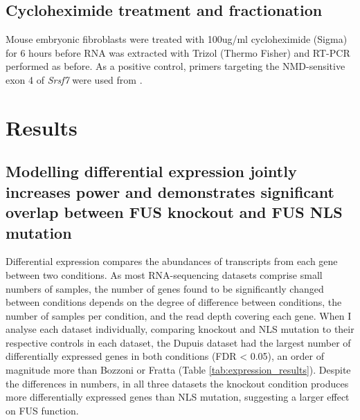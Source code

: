 \subsection{Cycloheximide treatment and fractionation}
Mouse embryonic fibroblasts were treated with 100ug/ml cycloheximide (Sigma) for 6 hours before RNA was extracted with Trizol (Thermo Fisher) and RT-PCR performed as before. 
As a positive control, primers targeting the NMD-sensitive exon 4 of \textit{Srsf7} were used from \citep{Edwards2016}.

\clearpage


\section{Results}

\subsection{Modelling differential expression jointly increases power and demonstrates significant overlap between FUS knockout and FUS NLS mutation}

Differential expression compares the abundances of transcripts from each gene between two conditions. 
As most RNA-sequencing datasets comprise small numbers of samples, the number of genes found to be significantly changed between conditions depends on the degree of difference between conditions, the number of samples per condition, and the read depth covering each gene. 
When I analyse each dataset individually, comparing knockout and NLS mutation to their respective controls in each dataset, the Dupuis dataset had the largest number of differentially expressed genes in both conditions (FDR < 0.05), an order of magnitude more than Bozzoni or Fratta (Table \ref{tab:expression_results}). 
Despite the differences in numbers, in all three datasets the knockout condition produces more differentially expressed genes than NLS mutation, suggesting a larger effect on FUS function.

